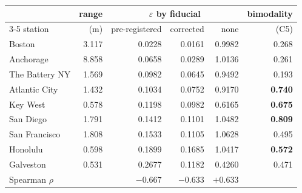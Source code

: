 \begin{tabular}{lrrrrr}
\toprule
& range & \multicolumn{3}{c}{$\varepsilon$ by fiducial} & bimodality \\
\cmidrule(lr){3-5}
station & (m) & pre-registered & corrected & none & (C5) \\
\midrule
Boston & 3.117 & 0.0228 & 0.0161 & 0.9982 & 0.268 \\
Anchorage & 8.858 & 0.0658 & 0.0289 & 1.0136 & 0.261 \\
The Battery NY & 1.569 & 0.0982 & 0.0645 & 0.9492 & 0.193 \\
Atlantic City & 1.432 & 0.1034 & 0.0752 & 0.9170 & \textbf{0.740} \\
Key West & 0.578 & 0.1198 & 0.0982 & 0.6165 & \textbf{0.675} \\
San Diego & 1.791 & 0.1412 & 0.1101 & 1.0482 & \textbf{0.809} \\
San Francisco & 1.808 & 0.1533 & 0.1105 & 1.0628 & 0.495 \\
Honolulu & 0.598 & 0.1899 & 0.1685 & 1.0417 & \textbf{0.572} \\
Galveston & 0.531 & 0.2677 & 0.1182 & 0.4260 & 0.471 \\
\midrule
Spearman $\rho$ & & $-0.667$ & $-0.633$ & $+0.633$ & \\
\bottomrule
\end{tabular}
